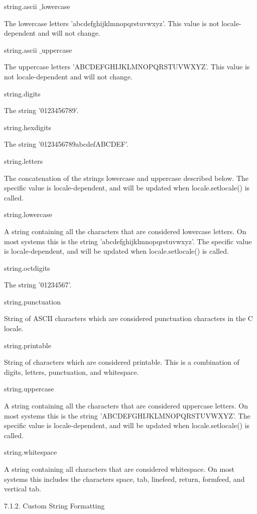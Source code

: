 string.ascii $  \_  $lowercase \par
The lowercase letters 'abcdefghijklmnopqrstuvwxyz'. This value is not locale-dependent and will not change. \par
string.ascii $  \_  $uppercase \par
The uppercase letters 'ABCDEFGHIJKLMNOPQRSTUVWXYZ'. This value is not locale-dependent and will not change. \par
string.digits \par
The string '0123456789'. \par
string.hexdigits \par
The string '0123456789abcdefABCDEF'. \par
string.letters \par
The concatenation of the strings lowercase and uppercase described below. The specific value is locale-dependent, and will be updated when locale.setlocale() is called. \par
string.lowercase \par
A string containing all the characters that are considered lowercase letters. On most systems this is the string 'abcdefghijklmnopqrstuvwxyz'. The specific value is locale-dependent, and will be updated when locale.setlocale() is called. \par
string.octdigits \par
The string '01234567'. \par
string.punctuation \par
String of ASCII characters which are considered punctuation characters in the C locale. \par
string.printable \par
String of characters which are considered printable. This is a combination of digits, letters, punctuation, and whitespace. \par
string.uppercase \par
A string containing all the characters that are considered uppercase letters. On most systems this is the string 'ABCDEFGHIJKLMNOPQRSTUVWXYZ'. The specific value is locale-dependent, and will be updated when locale.setlocale() is called. \par
string.whitespace \par
A string containing all characters that are considered whitespace. On most systems this includes the characters space, tab, linefeed, return, formfeed, and vertical tab. \par
7.1.2. Custom String Formatting \par

